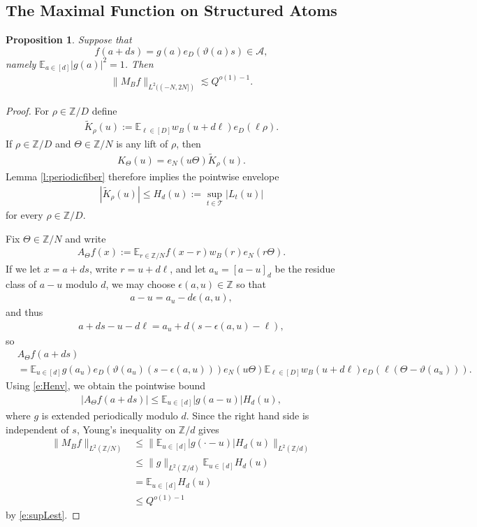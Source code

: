 \documentclass[12pt]{amsart}
\numberwithin{equation}{section}
\newtheorem{proposition}[theorem]{Proposition}
\theoremstyle{definition}
\begin{document}
\subsection{The Maximal Function on Structured Atoms}
\begin{proposition}\label{p:structuredatom}
Suppose that
\[ f(a+ds) = g(a) e_D(\vartheta(a) s) \in \mathcal{A}, \]
namely $\mathbb{E}_{a \in [d]} |g(a)|^2 = 1$. Then
\begin{align}
    \| M_B f \|_{L^2( (-N,2N] )} \lesssim Q^{o(1)-1}.
\end{align}
\end{proposition}
\begin{proof}
For $\rho\in\mathbb Z/D$ define
\begin{align}
    \widetilde K_\rho(u):=\mathbb E_{\ell\in[D]}w_B(u+d\ell)e_D(\ell\rho).
\end{align}
If $\rho\in\mathbb Z/D$ and $\Theta\in\mathbb Z/N$ is any lift of $\rho$, then
\begin{align}
    K_\Theta(u)=e_N(u\Theta)\widetilde K_\rho(u).
\end{align}
Lemma \ref{l:periodicfiber} therefore implies the pointwise envelope
\begin{align}\label{e:Henv}
    |\widetilde K_\rho(u)|\leq H_d(u):=\sup_{t\in\mathcal T}|L_t(u)|
\end{align}
for every $\rho\in\mathbb Z/D$.

Fix $\Theta\in\mathbb Z/N$ and write
\begin{align}
A_\Theta f(x):=\mathbb E_{r\in\mathbb Z/N}f(x-r)w_B(r)e_N(r\Theta).
\end{align}
If we let $x=a+ds$, write $r=u+d\ell$, and let $a_u=[a-u]_d$ be the residue class of $a-u$ modulo $d$, we may choose $\epsilon(a,u)\in\mathbb Z$ so that
\begin{align}
    a-u=a_u-d\epsilon(a,u),
\end{align}
and thus
\begin{align}
    a+ds-u-d\ell=a_u+d(s-\epsilon(a,u)-\ell),
\end{align}
so
\begin{align}
&A_\Theta f(a+ds) \\
&=\mathbb E_{u\in[d]}g(a_u)e_D(\vartheta(a_u)(s-\epsilon(a,u)))e_N(u\Theta)
    \mathbb E_{\ell\in[D]}w_B(u+d\ell)e_D(\ell(\Theta-\vartheta(a_u))) .
\end{align}
Using \eqref{e:Henv}, we obtain the pointwise bound
\begin{align}
    |A_\Theta f(a+ds)|\leq \mathbb E_{u\in[d]}|g(a-u)|H_d(u),
\end{align}
where $g$ is extended periodically modulo $d$.  Since the right hand side is independent of $s$, Young's inequality on $\mathbb Z/d$ gives
\begin{align}
\|M_Bf\|_{L^2(\mathbb Z/N)}
&\leq \big\|\mathbb E_{u\in[d]}|g(\cdot-u)|H_d(u)\big\|_{L^2(\mathbb Z/d)}\\
&\leq \|g\|_{L^2(\mathbb Z/d)}\mathbb E_{u\in[d]}H_d(u) \\
& =\mathbb E_{u\in[d]}H_d(u) \\
& \leq Q^{o(1)-1}
\end{align}
by \eqref{e:supLest}.
\end{proof}
\end{document}
